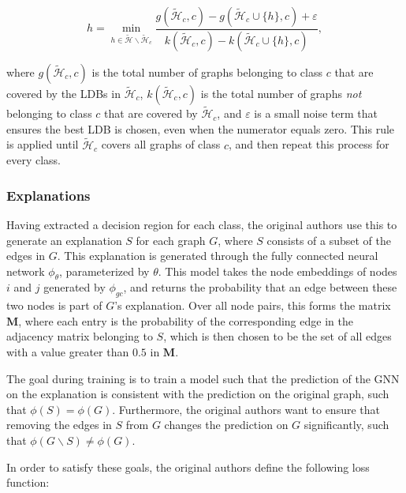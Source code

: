 \begin{equation}
    h = \min_{h \in \tilde{\mathcal{H}} \backslash \tilde{\mathcal{H}}_{c}} \frac{g(\tilde{\mathcal{H}}_{c}, c) - g(\tilde{\mathcal{H}}_{c} \cup \{h\}, c) + \varepsilon}{k(\tilde{\mathcal{H}}_{c}, c) - k(\tilde{\mathcal{H}}_{c} \cup \{h\}, c)},
\end{equation}

where $g(\tilde{\mathcal{H}}_{c}, c)$ is the total number of graphs belonging to class $c$ that are covered by the LDBs in $\tilde{\mathcal{H}}_{c}$, $k(\tilde{\mathcal{H}}_{c}, c)$ is the total number of graphs \textit{not} belonging to class $c$ that are covered by $\tilde{\mathcal{H}}_{c}$, and $\varepsilon$ is a small noise term that ensures the best LDB is chosen, even when the numerator equals zero. This rule is applied until $\tilde{\mathcal{H}}_{c}$ covers all graphs of class $c$, and then repeat this process for every class.

\subsubsection{Explanations}

Having extracted a decision region for each class, the original authors use this to generate an explanation $S$ for each graph $G$, where $S$ consists of a subset of the edges in $G$. This explanation is generated through the fully connected neural network $\phi_{\theta}$, parameterized by $\theta$. This model takes the node embeddings of nodes $i$ and $j$ generated by $\phi_{gc}$, and returns the probability that an edge between these two nodes is part of $G$'s explanation. Over all node pairs, this forms the matrix $\textbf{M}$, where each entry is the probability of the corresponding edge in the adjacency matrix belonging to $S$, which is then chosen to be the set of all edges with a value greater than $0.5$ in $\textbf{M}$.

The goal during training is to train a model such that the prediction of the GNN on the explanation is consistent with the prediction on the original graph, such that $\phi(S) = \phi(G)$. Furthermore, the original authors want to ensure that removing the edges in $S$ from $G$ changes the prediction on $G$ significantly, such that $\phi(G \backslash S) \neq \phi(G)$. 

In order to satisfy these goals, the original authors define the following loss function:

